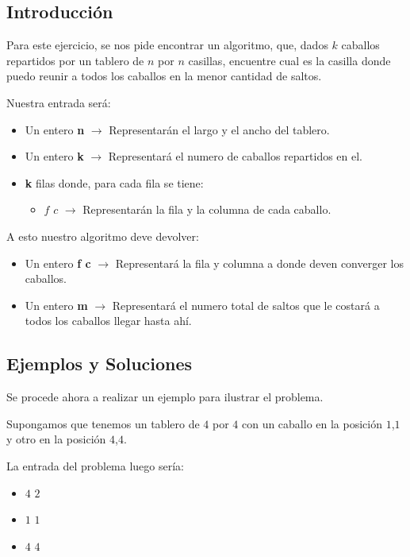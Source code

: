 \subsection{Introducci\'on} 

Para este ejercicio, se nos pide encontrar un algoritmo, que, dados $k$ caballos repartidos por un tablero de $n$ por $n$ casillas, encuentre cual es la casilla donde puedo reunir a todos los caballos en la menor cantidad de saltos.

Nuestra entrada ser\'a:

\begin{itemize}
\item Un entero \textbf{n} $\rightarrow$ Representar\'an el largo y el ancho del tablero.
\item Un entero \textbf{k} $\rightarrow$ Representar\'a el numero de caballos repartidos en el.
\item \textbf{k} filas donde, para cada fila se tiene:
\begin{itemize}
\item $f$ $c$ $\rightarrow$ Representar\'an la fila y la columna de cada caballo.
\end{itemize}
\end{itemize}

A esto nuestro algoritmo deve devolver:
\begin{itemize}
\item Un entero \textbf{f c} $\rightarrow$ Representar\'a la fila y columna a donde deven converger los caballos.
\item Un entero \textbf{m} $\rightarrow$ Representar\'a el numero total de saltos que le costar\'a a todos los caballos llegar hasta ah\'i.
\end{itemize}

\subsection{Ejemplos y Soluciones}
Se procede ahora a realizar un ejemplo para ilustrar el problema.

Supongamos que tenemos un tablero de $4$ por $4$ con un caballo en la posici\'on $1$,$1$ y otro en la posici\'on $4$,$4$.

La entrada del problema luego ser\'ia:

\begin{itemize}
\item $4$ $2$ 
\item $1$ $1$
\item $4$ $4$
\end{itemize}

